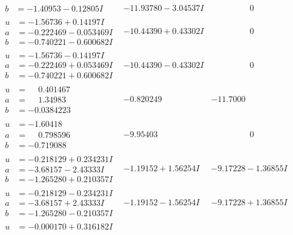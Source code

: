 \documentclass[1p]{elsarticle_modified}
\theoremstyle{definition}
\begin{document}
$$\begin{array}{c|c|c}
\begin{aligned}
b &= -1.40953 - 0.12805 I\end{aligned}
 & -11.93780 - 3.04537 I & \phantom{-0.000000 } 0 \\ \hline\begin{aligned}
u &= -1.56736 + 0.14197 I \\
a &= -0.222469 - 0.053469 I \\
b &= -0.740221 - 0.600682 I\end{aligned}
 & -10.44390 + 0.43302 I & \phantom{-0.000000 } 0 \\ \hline\begin{aligned}
u &= -1.56736 - 0.14197 I \\
a &= -0.222469 + 0.053469 I \\
b &= -0.740221 + 0.600682 I\end{aligned}
 & -10.44390 - 0.43302 I & \phantom{-0.000000 } 0 \\ \hline\begin{aligned}
u &= \phantom{-}0.401467\phantom{ +0.000000I} \\
a &= \phantom{-}1.34983\phantom{ +0.000000I} \\
b &= -0.0384223\phantom{ +0.000000I}\end{aligned}
 & -0.820249\phantom{ +0.000000I} & -11.7000\phantom{ +0.000000I} \\ \hline\begin{aligned}
u &= -1.60418\phantom{ +0.000000I} \\
a &= \phantom{-}0.798596\phantom{ +0.000000I} \\
b &= -0.719088\phantom{ +0.000000I}\end{aligned}
 & -9.95403\phantom{ +0.000000I} & \phantom{-0.000000 } 0 \\ \hline\begin{aligned}
u &= -0.218129 + 0.234231 I \\
a &= -3.68157 - 2.43333 I \\
b &= -1.265280 + 0.210357 I\end{aligned}
 & -1.19152 + 1.56254 I & -9.17228 - 1.36855 I \\ \hline\begin{aligned}
u &= -0.218129 - 0.234231 I \\
a &= -3.68157 + 2.43333 I \\
b &= -1.265280 - 0.210357 I\end{aligned}
 & -1.19152 - 1.56254 I & -9.17228 + 1.36855 I \\ \hline\begin{aligned}
u &= -0.000170 + 0.316182 I \\

\end{aligned}
\end{array}$$
\end{document}
